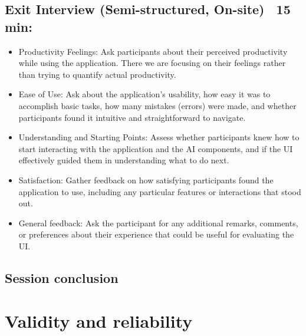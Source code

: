 \subsection{Exit Interview (Semi-structured, On-site) ~15 min:}
\begin{itemize}
    \item Productivity Feelings: Ask participants about their perceived productivity while using the application. There we are focusing on their feelings rather than trying to quantify actual productivity.
    \item Ease of Use: Ask about the application's usability, how easy it was to accomplish basic tasks, how many mistakes (errors) were made, and whether participants found it intuitive and straightforward to navigate.
    \item Understanding and Starting Points: Assess whether participants knew how to start interacting with the application and the AI components, and if the UI effectively guided them in understanding what to do next.
    \item Satisfaction: Gather feedback on how satisfying participants found the application to use, including any particular features or interactions that stood out.
    \item General feedback: Ask the participant for any additional remarks, comments, or preferences about their experience that could be useful for evaluating the UI.
\end{itemize}

\subsection{Session conclusion}

\section{Validity and reliability}

